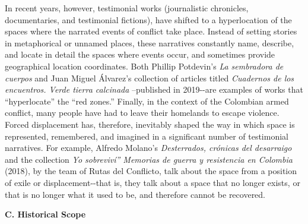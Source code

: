 \documentclass[
  11pt,
,
onecolumn,
openany
]{book}
\begin{document}
In recent years, however, testimonial works (journalistic chronicles,
documentaries, and testimonial fictions), have shifted to a hyperlocation of
the spaces where the narrated events of conflict take place. Instead of
setting stories in metaphorical or unnamed places, these narratives constantly
name, describe, and locate in detail the spaces where events occur, and
sometimes provide geographical location coordinates. Both Phillip Potdevin's
\emph{La sembradora de cuerpos} and Juan Miguel Álvarez's collection of
articles titled \emph{Cuadernos de los encuentros. Verde tierra calcinada}
--published in 2019-\/-are examples of works that ``hyperlocate'' the ``red
zones.'' Finally, in the context of the Colombian armed conflict, many people
have had to leave their homelands to escape violence. Forced displacement has,
therefore, inevitably shaped the way in which space is represented,
remembered, and imagined in a significant number of testimonial narratives.
For example, Alfredo Molano's \emph{Desterrados, crónicas del desarraigo} and
the collection \emph{Yo sobreviví'' Memorias de guerra y resistencia en
Colombia} (2018), by the team of Rutas del Conflicto, talk about the space
from a position of exile or displacement-\/-that is, they talk about a space
that no longer exists, or that is no longer what it used to be, and therefore
cannot be recovered.

\textbf{C. Historical Scope}
\end{document}
